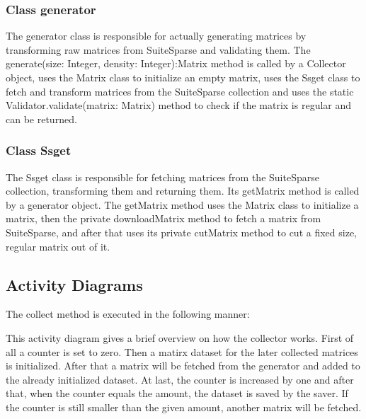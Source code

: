 \documentclass[parskip=full]{scrartcl}
\begin{document}
\subsubsection{Class generator}
The generator class is responsible for actually generating matrices by transforming raw matrices from SuiteSparse and validating them.
The generate(size: Integer, density: Integer):Matrix method is called by a Collector object, uses the Matrix class to initialize an empty matrix, uses the Ssget class to fetch and transform matrices from the SuiteSparse collection and uses the static Validator.validate(matrix: Matrix)  method to check if the matrix is regular and can be returned.

\subsubsection{Class Ssget}
The Ssget class is responsible for fetching matrices from the SuiteSparse collection, transforming them and returning them.
Its getMatrix method is called by a generator object.
The getMatrix method uses the Matrix class to initialize a matrix, then the private downloadMatrix method to fetch a matrix from SuiteSparse, and after that uses its private cutMatrix method to cut a fixed size, regular matrix out of it.

\subsection{Activity Diagrams}
The collect method is executed in the following manner:
\newpage
\begin{figure}[h]
\begin{center}

\label{Activity Diagrams}
\end{center}
\end{figure}
\newpage


This activity diagram gives a brief overview on how the collector works.
First of all a counter is set to zero. Then a matirx dataset for the later collected matrices is initialized.
After that a matrix will be fetched from the generator and added to the already initialized dataset.
At last, the counter is increased by one and after that, when the counter equals the amount, the dataset is saved by the saver.
If the counter is still smaller than the given amount, another matrix will be fetched.

\newpage
\begin{figure}[h]
\begin{center}

\label{Activity Diagrams}
\end{center}
\end{figure}
\newpage
\end{document}

